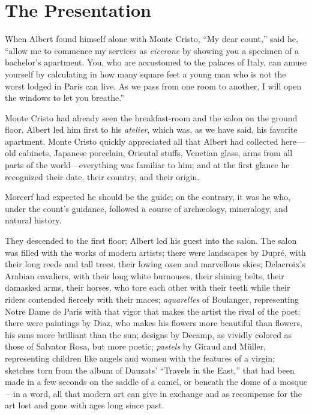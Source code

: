 \chapter{The Presentation}

When Albert found himself alone with Monte Cristo, “My dear count,”
said he, “allow me to commence my services as \textit{cicerone} by showing you
a specimen of a bachelor’s apartment. You, who are accustomed to the
palaces of Italy, can amuse yourself by calculating in how many square
feet a young man who is not the worst lodged in Paris can live. As we
pass from one room to another, I will open the windows to let you
breathe.”

Monte Cristo had already seen the breakfast-room and the salon on the
ground floor. Albert led him first to his \textit{atelier}, which was, as we
have said, his favorite apartment. Monte Cristo quickly appreciated all
that Albert had collected here—old cabinets, Japanese porcelain,
Oriental stuffs, Venetian glass, arms from all parts of the
world—everything was familiar to him; and at the first glance he
recognized their date, their country, and their origin.

Morcerf had expected he should be the guide; on the contrary, it was he
who, under the count’s guidance, followed a course of archæology,
mineralogy, and natural history.

They descended to the first floor; Albert led his guest into the salon.
The salon was filled with the works of modern artists; there were
landscapes by Dupré, with their long reeds and tall trees, their lowing
oxen and marvellous skies; Delacroix’s Arabian cavaliers, with their
long white burnouses, their shining belts, their damasked arms, their
horses, who tore each other with their teeth while their riders
contended fiercely with their maces; \textit{aquarelles} of Boulanger,
representing Notre Dame de Paris with that vigor that makes the artist
the rival of the poet; there were paintings by Diaz, who makes his
flowers more beautiful than flowers, his suns more brilliant than the
sun; designs by Decamp, as vividly colored as those of Salvator Rosa,
but more poetic; \textit{pastels} by Giraud and Müller, representing children
like angels and women with the features of a virgin; sketches torn from
the album of Dauzats’ “Travels in the East,” that had been made in a
few seconds on the saddle of a camel, or beneath the dome of a
mosque—in a word, all that modern art can give in exchange and as
recompense for the art lost and gone with ages long since past.

